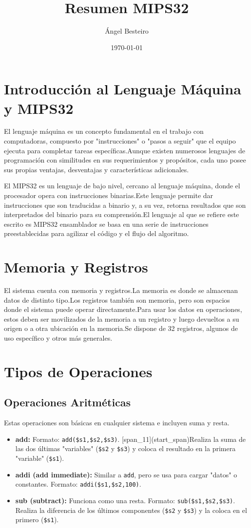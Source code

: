 \documentclass{article}
\title{Resumen MIPS32}
\author{Ángel Besteiro}
\date{\today}
\begin{document}
\maketitle

\section*{Introducción al Lenguaje Máquina y MIPS32}
El lenguaje máquina es un concepto fundamental en el trabajo con computadoras, compuesto por "instrucciones" o "pasos a seguir" que el equipo ejecuta para completar tareas específicas.Aunque existen numerosos lenguajes de programación con similitudes en sus requerimientos y propósitos, cada uno posee sus propias ventajas, desventajas y características adicionales.

El MIPS32 es un lenguaje de bajo nivel, cercano al lenguaje máquina, donde el procesador opera con instrucciones binarias.Este lenguaje permite dar instrucciones que son traducidas a binario y, a su vez, retorna resultados que son interpretados del binario para su comprensión.El lenguaje al que se refiere este escrito es MIPS32 ensamblador se basa en una serie de instrucciones preestablecidas para agilizar el código y el flujo del algoritmo.

\section*{Memoria y Registros}
El sistema cuenta con memoria y registros.La memoria es donde se almacenan datos de distinto tipo.Los registros también son memoria, pero son espacios donde el sistema puede operar directamente.Para usar los datos en operaciones, estos deben ser movilizados de la memoria a un registro y luego devueltos a su origen o a otra ubicación en la memoria.Se dispone de 32 registros, algunos de uso específico y otros más generales.

\section*{Tipos de Operaciones}

\subsection*{Operaciones Aritméticas}
Estas operaciones son básicas en cualquier sistema e incluyen suma y resta.
\begin{itemize}
    \item \textbf{add:} Formato: \texttt{add(\$s1,\$s2,\$s3)}. [span_11](start_span)Realiza la suma de las dos últimas "variables" (\texttt{\$s2} y \texttt{\$s3}) y coloca el resultado en la primera "variable" (\texttt{\$s1}).
    \item \textbf{addi (add immediate):} Similar a \texttt{add}, pero se usa para cargar "datos" o constantes. Formato: \texttt{addi(\$s1,\$s2,100)}.
    \item \textbf{sub (subtract):} Funciona como una resta. Formato: \texttt{sub(\$s1,\$s2,\$s3)}. Realiza la diferencia de los últimos componentes (\texttt{\$s2} y \texttt{\$s3}) y la coloca en el primero (\texttt{\$s1}).
\end{itemize}
\end{document}
